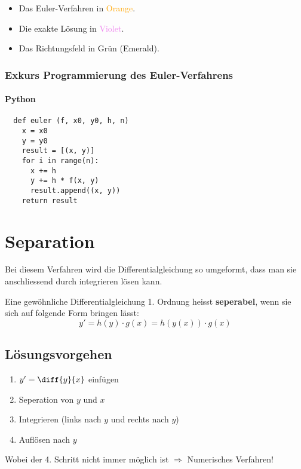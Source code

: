 \documentclass[10pt,a4paper]{article}
\begin{document}
\begin{mdframed}
    \begin{itemize}
      \item Das Euler-Verfahren in \textcolor{Orange}{Orange}.
      \item Die exakte Lösung in \textcolor{Violet}{Violet}.
      \item Das Richtungsfeld in \textcolor{Emerald}{Grün (Emerald)}.
    \end{itemize}
\end{mdframed}

\newpage
\subsubsection{Exkurs Programmierung des Euler-Verfahrens}
\paragraph{Python}
\begin{verbatim}
  def euler (f, x0, y0, h, n)
    x = x0
    y = y0
    result = [(x, y)]
    for i in range(n):
      x += h
      y += h * f(x, y)
      result.append((x, y))
    return result
\end{verbatim}

\section{Separation}
Bei diesem Verfahren wird die Differentialgleichung so umgeformt, dass man sie anschliessend durch integrieren lösen kann.
\begin{Definitionsbox}
  Eine gewöhnliche Differentialgleichung 1. Ordnung heisst \textbf{seperabel}, wenn sie sich auf folgende Form bringen lässt:
  \begin{equation*}
    y' = h(y) \cdot g(x) = h(y(x)) \cdot g(x)
  \end{equation*}
\end{Definitionsbox}

\subsection{Lösungsvorgehen}
\begin{enumerate}
  \item $y' = \diff{y}{x}$ einfügen
  \item Seperation von $y$ und $x$
  \item Integrieren (links nach $y$ und rechts nach $y$)
  \item Auflösen nach $y$
\end{enumerate}
Wobei der 4. Schritt nicht immer möglich ist $\Rightarrow$ Numerisches Verfahren!
\end{document}
